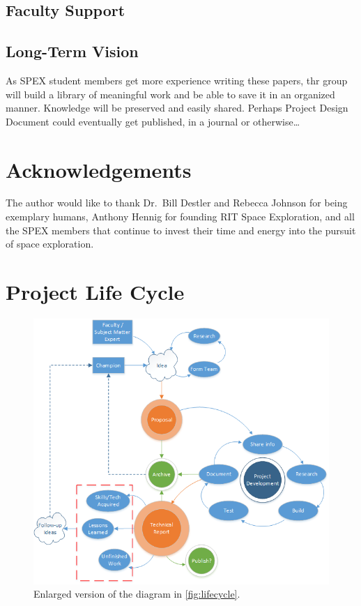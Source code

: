 \documentclass[conference]{IEEEtran} %
\begin{document}
\subsection{Faculty Support}

\subsection{Long-Term Vision}
\label{sec:vision}
As SPEX student members get more experience writing these papers, thr group will build a library of meaningful work and be able to save it in an organized manner.
Knowledge will be preserved and easily shared.
Perhaps Project Design Document could eventually get published, in a journal or otherwise\ldots

\section*{Acknowledgements}
The author would like to thank Dr.~Bill Destler and Rebecca Johnson for being exemplary humans, Anthony Hennig for founding RIT Space Exploration, and all the SPEX members that continue to invest their time and energy into the pursuit of space exploration.

\onecolumn
\appendices{}
\section{Project Life Cycle}
\begin{figure}[h]
  \centering
  \includegraphics[]{figs/project-life-cycle.png}
  \caption{Enlarged version of the diagram in \autoref{fig:lifecycle}.}
\end{figure}
\end{document}
